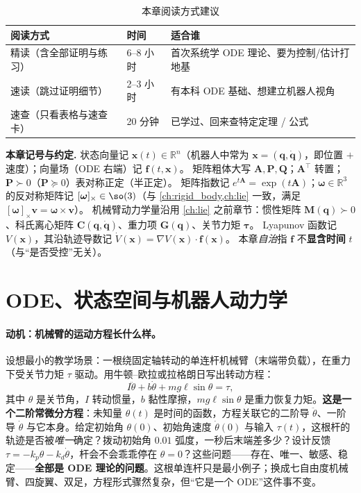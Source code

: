 \begin{table}[H]\centering\small
\caption{本章阅读方式建议}
\begin{tabular}{lll}
\toprule
阅读方式 & 时间 & 适合谁 \\
\midrule
精读（含全部证明与练习） & 6--8 小时 & 首次系统学 ODE 理论、要为控制/估计打地基 \\
速读（跳过证明细节） & 2--3 小时 & 有本科 ODE 基础、想建立机器人视角 \\
速查（只看表格与速查卡） & 20 分钟 & 已学过、回来查特定定理 / 公式 \\
\bottomrule
\end{tabular}
\end{table}

\begin{note}
\textbf{本章记号与约定.}\;
状态向量记 $\mathbf{x}(t)\in\mathbb{R}^n$（机器人中常为 $\mathbf{x}=(\mathbf{q},\dot{\mathbf{q}})$，即位置 $+$ 速度）；向量场（ODE 右端）记 $\mathbf{f}(t,\mathbf{x})$。
矩阵粗体大写 $\mathbf{A},\mathbf{P},\mathbf{Q}$；$\mathbf{A}^\top$ 转置；$\mathbf{P}\succ0$（$\mathbf{P}\succeq0$）表对称正定（半正定）。
矩阵指数记 $e^{t\mathbf{A}}=\exp(t\mathbf{A})$；$\boldsymbol{\omega}\in\mathbb{R}^3$ 的反对称矩阵记 $[\boldsymbol{\omega}]_\times\in\so(3)$（与 \cref{ch:rigid_body,ch:lie} 一致，满足 $[\boldsymbol{\omega}]_\times\mathbf{v}=\boldsymbol{\omega}\times\mathbf{v}$）。
机械臂动力学量沿用 \cref{ch:lie} 之前章节：惯性矩阵 $\mathbf{M}(\mathbf{q})\succ0$、科氏离心矩阵 $\mathbf{C}(\mathbf{q},\dot{\mathbf{q}})$、重力项 $\mathbf{G}(\mathbf{q})$、关节力矩 $\boldsymbol{\tau}$。
Lyapunov 函数记 $V(\mathbf{x})$，其沿轨迹导数记 $\dot V(\mathbf{x})=\nabla V(\mathbf{x})\cdot\mathbf{f}(\mathbf{x})$。
本章\emph{自治}指 $\mathbf{f}$ 不\textbf{显含时间} $t$（与“是否受控”无关）。
\end{note}

\section{ODE、状态空间与机器人动力学}
\label{sec:ode-basic}

\paragraph{动机：机械臂的运动方程长什么样。}
设想最小的教学场景：一根绕固定轴转动的单连杆机械臂（末端带负载），在重力下受关节力矩 $\tau$ 驱动。用牛顿--欧拉或拉格朗日写出转动方程：
\begin{equation}
  I\ddot\theta+b\dot\theta+mg\ell\sin\theta=\tau,
  \label{eq:single-link}
\end{equation}
其中 $\theta$ 是关节角，$I$ 转动惯量，$b$ 黏性摩擦，$mg\ell\sin\theta$ 是重力恢复力矩。\textbf{这是一个二阶常微分方程}：未知量 $\theta(t)$ 是时间的函数，方程关联它的二阶导 $\ddot\theta$、一阶导 $\dot\theta$ 与它本身。给定初始角 $\theta(0)$、初始角速度 $\dot\theta(0)$ 与输入 $\tau(t)$，这根杆的轨迹是否被\emph{唯一}确定？拨动初始角 $0.01$ 弧度，一秒后末端差多少？设计反馈 $\tau=-k_p\theta-k_d\dot\theta$，杆会不会乖乖停在 $\theta=0$？这些问题——存在、唯一、敏感、稳定——\textbf{全部是 ODE 理论的问题}。这根单连杆只是最小例子；换成七自由度机械臂、四旋翼、双足，方程形式骤然复杂，但“它是一个 ODE”这件事不变。

